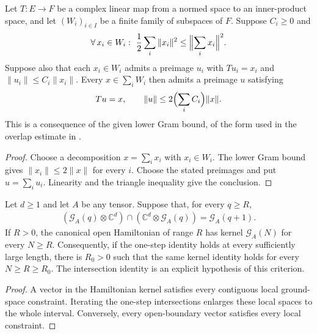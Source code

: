 \begin{lemma}
    \label{thm:sector_bounded_preimages}
    \leanok
    Let $T:E\to F$ be a complex linear map from a normed space to an
    inner-product space, and let $(W_i)_{i\in I}$ be a finite family of
    subspaces of $F$. Suppose $C_i\geq0$ and
    \begin{align}
        \forall\,x_i\in W_i:\ \frac12\sum_i\|x_i\|^2\leq\Bigl\|\sum_i x_i\Bigr\|^2.
    \end{align}
    Suppose also that each $x_i\in W_i$ admits a preimage $u_i$ with
    $Tu_i=x_i$ and $\|u_i\|\leq C_i\|x_i\|$.
    Every $x\in\sum_iW_i$ then admits a preimage $u$ satisfying
    \begin{align}
        Tu=x,\qquad \|u\|\leq2\Bigl(\sum_iC_i\Bigr)\|x\|.
    \end{align}
    This is a consequence of the given lower Gram bound, of the form
    used in the overlap estimate in
    \cite[Section~4]{Nachtergaele1996Spectral}.
\end{lemma}
\begin{proof}\leanok
    Choose a decomposition $x=\sum_i x_i$ with $x_i\in W_i$.
    The lower Gram bound gives $\|x_i\|\leq2\|x\|$ for every $i$.
    Choose the stated preimages and put $u=\sum_i u_i$.
    Linearity and the triangle inequality give the conclusion.
\end{proof}

\begin{lemma}
    \label{thm:canonical_open_kernel_from_eventual_intersection}
    \leanok
    Let $d\ge1$ and let $A$ be any tensor. Suppose that, for every $q\ge R$,
    \begin{align}
        (\mathcal G_A(q)\otimes\mathbb C^d)
        \cap(\mathbb C^d\otimes\mathcal G_A(q))=\mathcal G_A(q+1).
    \end{align}
    If $R>0$, the canonical open Hamiltonian of range $R$ has kernel
    $\mathcal G_A(N)$ for every $N\ge R$.
    Consequently, if the one-step identity holds at every sufficiently
    large length, there is $R_0>0$ such that the same kernel identity holds
    for every $N\ge R\ge R_0$.
    The intersection identity is an explicit hypothesis of this criterion.
\end{lemma}
\begin{proof}\leanok
    A vector in the Hamiltonian kernel satisfies every contiguous local
    ground-space constraint. Iterating the one-step intersections enlarges
    these local spaces to the whole interval. Conversely, every
    open-boundary vector satisfies every local constraint.
\end{proof}

